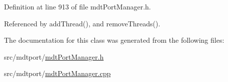 Definition at line 913 of file mdt\-Port\-Manager.\-h.



Referenced by add\-Thread(), and remove\-Threads().



The documentation for this class was generated from the following files\-:\begin{DoxyCompactItemize}
\item 
src/mdtport/\hyperlink{mdt_port_manager_8h}{mdt\-Port\-Manager.\-h}\item 
src/mdtport/\hyperlink{mdt_port_manager_8cpp}{mdt\-Port\-Manager.\-cpp}\end{DoxyCompactItemize}
